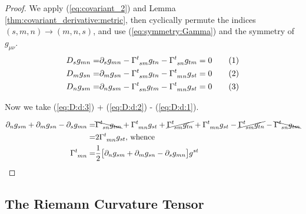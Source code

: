 \documentclass[]{article}
\newcommand\numberthis{\addtocounter{equation}{1}\tag{\theequation}}
\begin{document}
\begin{proof}
	We apply (\ref{eq:covariant_2}) and Lemma \ref{thm:covariant_derivative:metric}, then cyclically permute the indices $(s,m,n)\rightarrow(m,n,s)$, and use (\ref{eq:symmetry:Gamma}) and the symmetry of $g_{\mu\nu}$.
	\begin{align*}
		D_s g_{mn} =& \partial_s g_{mn} - \Gamma\indices{^t_{sm}} g_{tn} - \Gamma\indices{^t_{sn}} g_{tm} 	= 0  \numberthis \label{eq:D:d:1}\\
		D_m g_{sn} =& \partial_m g_{sn} -\Gamma\indices{^t_{sm}} g_{tn} - \Gamma\indices{^t_{mn}} g_{st} 	= 0 \numberthis \label{eq:D:d:2} \\
		D_n g_{sm} =& \partial_n g_{sm} - \Gamma\indices{^t_{sn}} g_{tm} - \Gamma\indices{^t_{mn}} g_{st} 	= 0 \numberthis \label{eq:D:d:3}
	\end{align*}
	
	Now we take (\ref{eq:D:d:3}) + (\ref{eq:D:d:2}) - (\ref{eq:D:d:1}).
	
	\begin{align*}
		\partial_n g_{sm} + \partial_m g_{sn}- \partial_s g_{mn} =& \bcancel{\Gamma\indices{^t_{sn}} g_{tm}} + \Gamma\indices{^t_{mn}} g_{st} + \cancel{\Gamma\indices{^t_{sm}}g_{tn}} + \Gamma\indices{^t_{mn}} g_{st} - \cancel{\Gamma\indices{^t_{sm}} g_{tn}} - \bcancel{\Gamma\indices{^t_{sn}} g_{tm}} \\
		=&2 \Gamma\indices{^t_{mn}} g_{st} \text{, whence}\\
		\Gamma\indices{^t_{mn}} =& \frac{1}{2}\big[\partial_n g_{sm} + \partial_m g_{sn}- \partial_s g_{mn}\big]  g^{st}   
	\end{align*}
\end{proof}

\subsection{The Riemann Curvature Tensor}
\end{document}
